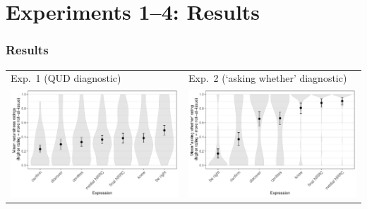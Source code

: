 \documentclass[compress, xcolor = dvipsnames, aspectratio=169]{beamer}
\begin{document}

	


\section{Experiments 1–4: Results}

	\begin{frame}[t]\frametitle{Results}\scriptsize
		\vspace{-2\baselineskip}
			\begin{center}
			\begin{tabular}{p{.4\linewidth} p{.4\linewidth}}
				{\centering Exp.~1 (QUD diagnostic)} &
				{\centering Exp.~2 (`asking whether' diagnostic)} \\
	      		\includegraphics[width=\linewidth]{../../results/exp1/graphs/mean-ratings.pdf}
	      		&
	      		\includegraphics[width=\linewidth]{../../results/exp2/graphs/mean-ratings.pdf}

\end{tabular}
\end{center}
\end{frame}
\end{document}

